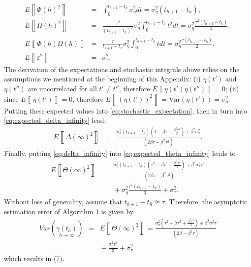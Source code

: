 \documentclass[10pt,journal,compsoc]{IEEEtran}
\newcommand{\expected}[1]{E\!\left\llbracket #1 \right\rrbracket}
\begin{document}
\begin{eqnarray}
\expected{\Phi(h)^2}\!\!\!\!\!\!\! 
& = & \!\!\!\!\!\!
\int_{0}^{t_{h+1}-t_h}\!\!\!\!\!\!\!\!\!\!\!\!\!\!\!\!\!\!\sigma_{\eta}^{2}dt =  \sigma_{\eta}^{2}(t_{h+1}-t_h),\\
\expected{\Omega(h)^2}\!\!\!\!\!\!\! 
& = & \!\!\!\!\!\!
\frac{\tau^2}{(t_{h+1}\!\!-\!\!t_h)^2}
\sigma_{\eta}^{2}\!\!\!\int_{0}^{t_{h+1}-t_h}\!\!\!\!\!\!\!\!\!\!\!\!\!\!\!\!\!\!\!t^2dt\! = \!
\sigma_{\eta}^{2}\!\frac{\tau^2(\!t_{h+1}\!\!-\!\!t_h\!)}{3},\label{eq:stochastic_integral}\\
\expected{\Phi(h)\Omega(h)}\!\!\!\!\!\!\! 
& = & \!\!\!\!\!\!
\frac{\tau}{t_{h+1}-t_h}\sigma_{\eta}^{2}\int_{0}^{t_{h+1}-t_h}\!\!\!\!\!\!\!\!\!\!\!\!\!\!\!\!\!\!tdt = 
\sigma_{\eta}^{2}\frac{\tau(\!t_{h+1}\!\!-\!\!t_h\!)}{2}, \\
\expected{\varepsilon^2}\!\!\!\!\!\!\! 
& = & \!\!\!\!\!\! 
\sigma_{\tau}^{2}.
\end{eqnarray}	
The derivation of the expectations and stochastic integrals above relies on the 
assumptions we mentioned 
at the beginning of this Appendix: (i) $\eta(t')$ and $\eta(t'')$ are 
uncorrelated for all $t'\neq t''$, therefore $\expected{\eta(t')\eta(t'')}=0$; 
(ii) since $\expected{\eta(t')}=0$, therefore 
$\expected{(\eta(t'))^2}=\mathrm{Var}(\eta(t'))=\sigma_{\eta}^2$. Putting these 
expected 
values into \eqref{eq:stochastic_expectation}, then in 
turn into \eqref{eq:expected_delta_infinity} lead:
\begin{eqnarray}
\expected{\Delta(\infty)^2}\!\!\!\!\!\!
& = &\!\!\!\!\!\!
\frac{\sigma^2_{\eta}(t_{h+1}-t_h)\left(1-\beta\tau+\frac{\beta^2\tau^2}{3}\right)\!\!+\!\!\beta^2\sigma^2_{\tau}}{(2\beta\tau-\beta^2\tau^2)}.
\label{eq:delta_infinity}
\end{eqnarray}
Finally, putting \eqref{eq:delta_infinity} into 
\eqref{eq:expected_theta_infinity} 
leads to
\begin{eqnarray}
\expected{\Theta(\infty)^2}\!\!\!\!\!\!\! & = & \!\!\!\!\!\!\!
\frac{\sigma^2_{\eta}(t_{h+1}-t_h)\left(\tau^2
	-\beta\tau^3-\frac{\beta^2\tau^4}{3}\right)
	+\beta^2\sigma^2_{\tau}\tau^2}{(2\beta\tau-\beta^2\tau^2)} \nonumber \\ 
\!\!\!\!\!\!\! &  & \!\!\!\!\!\!\!+ 
\sigma^2_{\eta}\frac{\tau^2(t_{h+1}-t_h)}{3}+\sigma^2_{\tau}.
\end{eqnarray}
Without loss of generality, assume that $t_{h+1}-t_h\approxeq\tau$. Therefore, 
the asymptotic estimation error of Algorithm 1 is given by
\begin{eqnarray}
Var\left(\underset{h\rightarrow\infty}{\gamma(t_h)}\right)\!\!\!\!\!\!\!& = &\!\!\!\!\!\! 
\expected{\Theta(\infty)^2}\!\! = \!\!
\frac{\sigma^2_{\eta}\left(\tau^2-\beta\tau^3
	+\frac{\beta^2\tau^4}{3}\right)
	+\beta^2\sigma^2_{\tau}\tau}{(2\beta-\beta^2\tau)} \nonumber \\
\!\!\!\!\!\!\!& = &\!\!\!\!\!\!  +\frac{\sigma^2_{\eta}\tau^3}{3}
+  \sigma^2_{\tau}
\end{eqnarray}
which results in (7).




\end{document}
